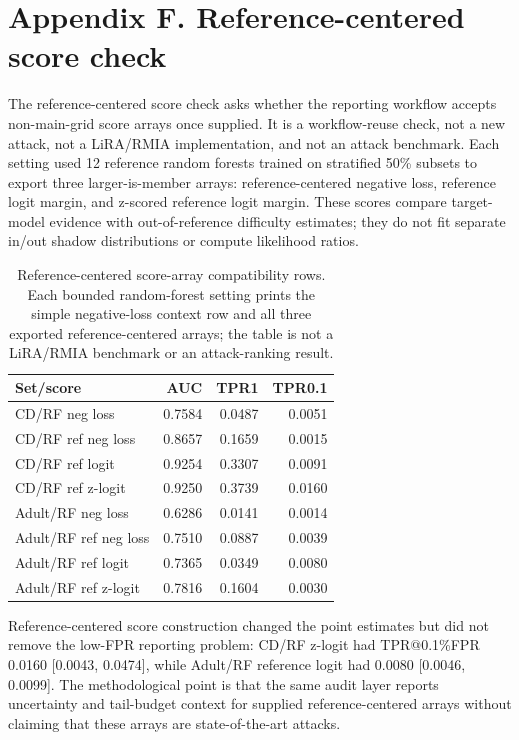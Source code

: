 \documentclass[
  10pt,
  twocolumn]{article}
\begin{document}
\hypertarget{appendix-f-reference-centered-score-check}{%
\section{Appendix F. Reference-centered score check}\label{appendix-f-reference-centered-score-check}}

The reference-centered score check asks whether the reporting workflow accepts non-main-grid score arrays once supplied. It is a workflow-reuse check, not a new attack, not a LiRA/RMIA implementation, and not an attack benchmark. Each setting used 12 reference random forests trained on stratified 50\% subsets to export three larger-is-member arrays: reference-centered negative loss, reference logit margin, and z-scored reference logit margin. These scores compare target-model evidence with out-of-reference difficulty estimates; they do not fit separate in/out shadow distributions or compute likelihood ratios.

\begin{table}[H]
\centering
\scriptsize
\caption{Reference-centered score-array compatibility rows. Each bounded random-forest setting prints the simple negative-loss context row and all three exported reference-centered arrays; the table is not a LiRA/RMIA benchmark or an attack-ranking result.}
\label{tab:reference-centered-score-appendix}
\setlength{\tabcolsep}{3pt}
\begin{tabular}{@{}l r r r@{}}
\toprule
Set/score & AUC & TPR1 & TPR0.1 \\
\midrule
CD/RF neg loss & 0.7584 & 0.0487 & 0.0051 \\
CD/RF ref neg loss & 0.8657 & 0.1659 & 0.0015 \\
CD/RF ref logit & 0.9254 & 0.3307 & 0.0091 \\
CD/RF ref z-logit & 0.9250 & 0.3739 & 0.0160 \\
Adult/RF neg loss & 0.6286 & 0.0141 & 0.0014 \\
Adult/RF ref neg loss & 0.7510 & 0.0887 & 0.0039 \\
Adult/RF ref logit & 0.7365 & 0.0349 & 0.0080 \\
Adult/RF ref z-logit & 0.7816 & 0.1604 & 0.0030 \\
\bottomrule
\end{tabular}
\end{table}

Reference-centered score construction changed the point estimates but did not remove the low-FPR reporting problem: CD/RF z-logit had TPR@0.1\%FPR 0.0160 {[}0.0043, 0.0474{]}, while Adult/RF reference logit had 0.0080 {[}0.0046, 0.0099{]}. The methodological point is that the same audit layer reports uncertainty and tail-budget context for supplied reference-centered arrays without claiming that these arrays are state-of-the-art attacks.
\end{document}
